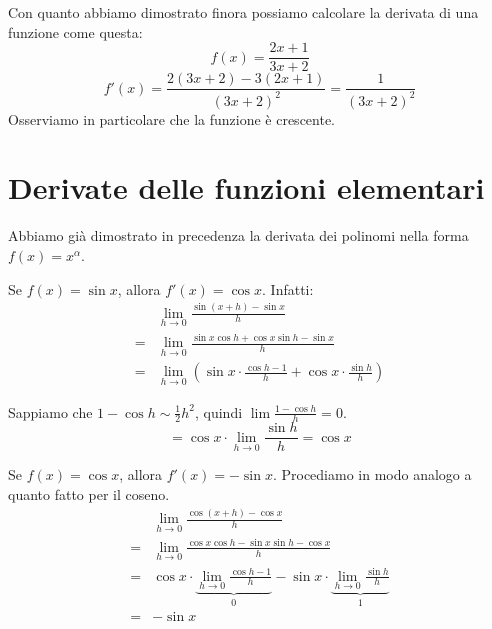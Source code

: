 \begin{example}
Con quanto abbiamo dimostrato finora possiamo calcolare la derivata di una funzione come questa:
\begin{equation*}
f(x) = \frac{2x+1}{3x+2}
\end{equation*}
\begin{equation*}
f'(x) = \frac{2(3x+2)-3(2x+1)}{(3x+2)^2} = \frac{1}{(3x+2)^2}
\end{equation*}
Osserviamo in particolare che la funzione è crescente.
\end{example}

\section{Derivate delle funzioni elementari}

Abbiamo già dimostrato in precedenza la derivata dei polinomi nella forma $f(x) = x^\alpha$.

\begin{remark}
Se $f(x) = \sin x$, allora $f'(x) = \cos x$. Infatti:
\begingroup
\addtolength{\jot}{1ex}
\begin{align*}
& \lim_{h \to 0} \frac{\sin (x+h) - \sin x}{h} \\
= & \lim_{h \to 0} \frac{\sin x \cos h + \cos x \sin h - \sin x}{h} \\
= & \lim_{h \to 0} \left( \sin x \cdot \frac{\cos h - 1}{h} + \cos x \cdot \frac{\sin h}{h} \right)
\end{align*}
\endgroup

Sappiamo che $1 - \cos h \sim \frac{1}{2} h^2$, quindi $\lim \frac{1-\cos h}{h} = 0$.
\begin{equation*}
= \cos x \cdot \lim_{h \to 0} \frac{\sin h}{h} = \cos x
\end{equation*}
\end{remark}

\begin{remark}
Se $f(x) = \cos x$, allora $f'(x) = -\sin x$. Procediamo in modo analogo a quanto fatto per il coseno.
\begingroup
\addtolength{\jot}{1ex}
\begin{align*}
& \lim_{h \to 0} \frac{\cos (x+h) - \cos x}{h} \\
= & \lim_{h \to 0} \frac{\cos x \cos h - \sin x \sin h - \cos x}{h} \\
= & \cos x \cdot \underbrace{\lim_{h \to 0} \frac{\cos h - 1}{h}}_{0} - \sin x \cdot \underbrace{\lim_{h \to 0} \frac{\sin h}{h}}_{1} \\
= & - \sin x
\end{align*}
\endgroup
\end{remark}

